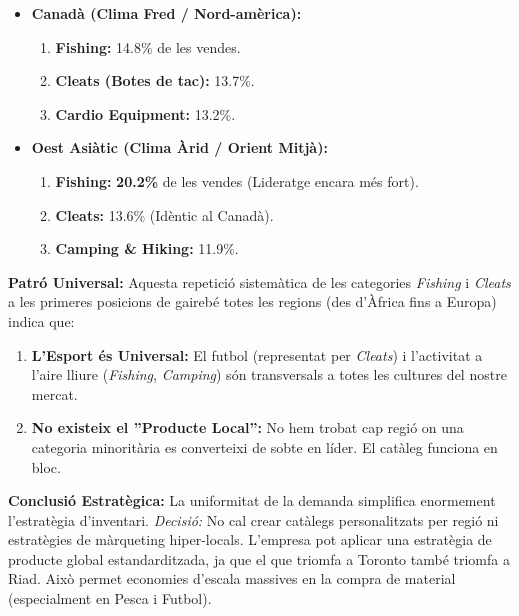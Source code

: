 \documentclass[12pt,a4paper]{article}
\begin{document}
\begin{itemize}
    \item \textbf{Canadà (Clima Fred / Nord-amèrica):}
    \begin{enumerate}
        \item \textbf{Fishing:} 14.8\% de les vendes.
        \item \textbf{Cleats (Botes de tac):} 13.7\%.
        \item \textbf{Cardio Equipment:} 13.2\%.
    \end{enumerate}
    
    \item \textbf{Oest Asiàtic (Clima Àrid / Orient Mitjà):}
    \begin{enumerate}
        \item \textbf{Fishing:} \textbf{20.2\%} de les vendes (Lideratge encara més fort).
        \item \textbf{Cleats:} 13.6\% (Idèntic al Canadà).
        \item \textbf{Camping \& Hiking:} 11.9\%.
    \end{enumerate}
\end{itemize}

\textbf{Patró Universal:}
Aquesta repetició sistemàtica de les categories \textit{Fishing} i \textit{Cleats} a les primeres posicions de gairebé totes les regions (des d'Àfrica fins a Europa) indica que:
\begin{enumerate}
    \item \textbf{L'Esport és Universal:} El futbol (representat per \textit{Cleats}) i l'activitat a l'aire lliure (\textit{Fishing}, \textit{Camping}) són transversals a totes les cultures del nostre mercat.
    \item \textbf{No existeix el ''Producte Local'':} No hem trobat cap regió on una categoria minoritària es converteixi de sobte en líder. El catàleg funciona en bloc.
\end{enumerate}

\textbf{Conclusió Estratègica:}
La uniformitat de la demanda simplifica enormement l'estratègia d'inventari.
\textit{Decisió:} No cal crear catàlegs personalitzats per regió ni estratègies de màrqueting hiper-locals. L'empresa pot aplicar una estratègia de producte global estandarditzada, ja que el que triomfa a Toronto també triomfa a Riad. Això permet economies d'escala massives en la compra de material (especialment en Pesca i Futbol).
\end{document}
